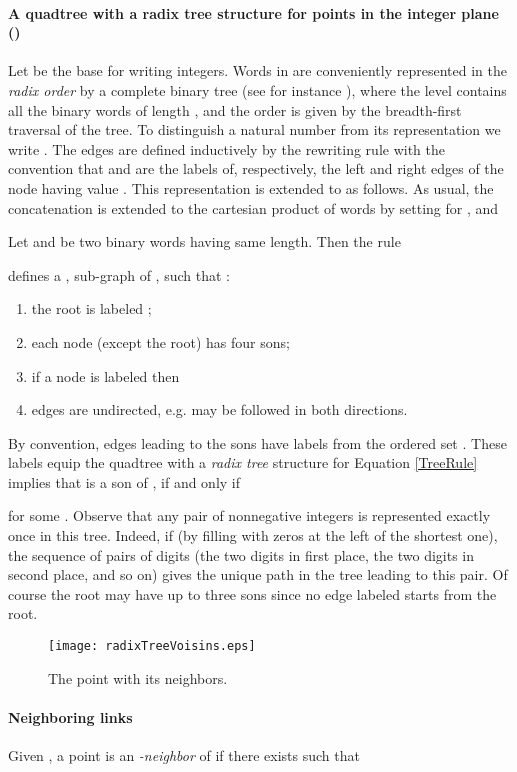 \paragraph*{A quadtree with a radix tree structure for points in the integer plane {\rm(\cite{BKPproc,BKP})}}
Let  be the base  for writing  integers. Words in  are conveniently represented in the {\em radix order} by a complete binary tree (see for instance \cite{knuth3,lothaire3}), where the level  contains all the binary words of length , and the order is given by the breadth-first traversal of  the tree. To distinguish a natural number  from its representation we write .  The edges are defined inductively by the rewriting rule  with the convention that   and  are the labels of, respectively,  the left and right edges of the node having value . This representation  is extended to  as follows. As usual, the concatenation is extended to the cartesian product of words by setting for , and 

Let  and  be two binary words having same length.  Then the rule 

defines a   , sub-graph  of  ,   such that :
\begin{enumerate}[\rm (i)]
 \item the root is labeled ;
 \item each  node (except the root) has four sons;
 \item if a node is labeled  then  
 \item edges are undirected, e.g. may be followed in both directions.
 \end{enumerate}
 By convention, edges leading to the sons have labels from the ordered set . These labels equip  the quadtree  with a \emph{radix tree} structure for Equation \eqref{TreeRule} implies that  is a son of , if and only if
 
for some   . Observe that any pair  of nonnegative integers is represented exactly once in this tree. Indeed, if    (by filling with zeros at the left of the shortest one), the sequence of pairs of digits (the two digits in first place, the two digits in second place, and so on) gives the unique path in the tree leading to this pair. Of course the root may have up to three sons since no edge labeled   starts from the root.\\ 
\begin{figure}[h!]
\centering
\texttt{[image: radixTreeVoisins.eps]}
\caption{The  point  with its neighbors.}\label{RadixTree}
\end{figure}
\paragraph{Neighboring links {\rm\cite{BKPproc,BKP}}}
Given  , a point  is an {\em \bse-neighbor} of   if there exists  such that  
\smallskip

